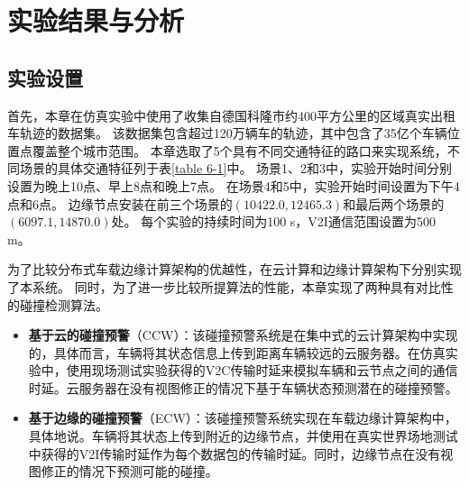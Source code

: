 \section{实验结果与分析}\label{section 5-4}

\subsection{实验设置}

首先，本章在仿真实验中使用了收集自德国科隆市约400平方公里的区域真实出租车轨迹的数据集\cite{uppoor2013generation}。
该数据集包含超过120万辆车的轨迹，其中包含了35亿个车辆位置点覆盖整个城市范围。
本章选取了5个具有不同交通特征的路口来实现系统，不同场景的具体交通特征列于表\ref{table 6-1}中。
场景1、2和3中，实验开始时间分别设置为晚上10点、早上8点和晚上7点。
在场景4和5中，实验开始时间设置为下午4点和6点。
边缘节点安装在前三个场景的$(10422.0, 12465.3)$和最后两个场景的$(6097.1, 14870.0)$处。
每个实验的持续时间为100 s，V2I通信范围设置为500 m。

\begin{table}[h]\small
\centering
{}
\label{table 6-1}
\end{table}

为了比较分布式车载边缘计算架构的优越性，在云计算和边缘计算架构下分别实现了本系统。
同时，为了进一步比较所提算法的性能，本章实现了两种具有对比性的碰撞检测算法。
\begin{itemize}
	\item \textbf{基于云的碰撞预警}（CCW）：该碰撞预警系统是在集中式的云计算架构中实现的，具体而言，车辆将其状态信息上传到距离车辆较远的云服务器。在仿真实验中，使用现场测试实验获得的V2C传输时延来模拟车辆和云节点之间的通信时延。云服务器在没有视图修正的情况下基于车辆状态预测潜在的碰撞预警。
	\item \textbf{基于边缘的碰撞预警}（ECW）：该碰撞预警系统实现在车载边缘计算架构中，具体地说。车辆将其状态上传到附近的边缘节点，并使用在真实世界场地测试中获得的V2I传输时延作为每个数据包的传输时延。同时，边缘节点在没有视图修正的情况下预测可能的碰撞。
\end{itemize}

